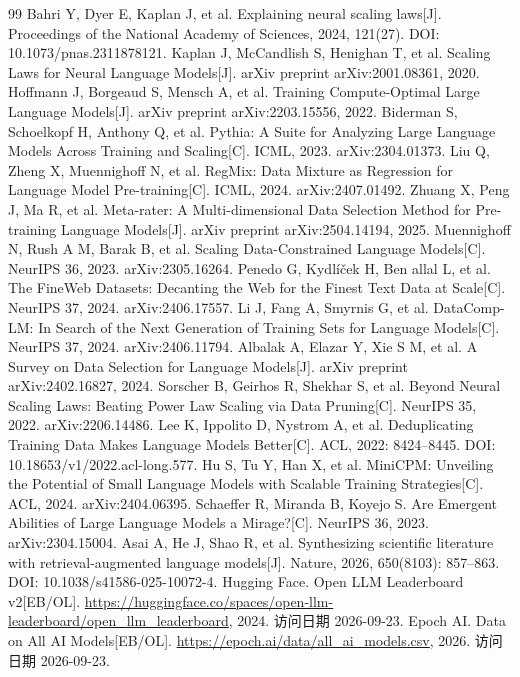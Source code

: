\documentclass[bwprint]{gmcmthesis}
\begin{document}
\begin{thebibliography}{99}
 Bahri Y, Dyer E, Kaplan J, et al. Explaining neural scaling laws[J]. Proceedings of the National Academy of Sciences, 2024, 121(27). DOI: 10.1073/pnas.2311878121.
 Kaplan J, McCandlish S, Henighan T, et al. Scaling Laws for Neural Language Models[J]. arXiv preprint arXiv:2001.08361, 2020.
 Hoffmann J, Borgeaud S, Mensch A, et al. Training Compute-Optimal Large Language Models[J]. arXiv preprint arXiv:2203.15556, 2022.
 Biderman S, Schoelkopf H, Anthony Q, et al. Pythia: A Suite for Analyzing Large Language Models Across Training and Scaling[C]. ICML, 2023. arXiv:2304.01373.
 Liu Q, Zheng X, Muennighoff N, et al. RegMix: Data Mixture as Regression for Language Model Pre-training[C]. ICML, 2024. arXiv:2407.01492.
 Zhuang X, Peng J, Ma R, et al. Meta-rater: A Multi-dimensional Data Selection Method for Pre-training Language Models[J]. arXiv preprint arXiv:2504.14194, 2025.
 Muennighoff N, Rush A M, Barak B, et al. Scaling Data-Constrained Language Models[C]. NeurIPS 36, 2023. arXiv:2305.16264.
 Penedo G, Kydlíček H, Ben allal L, et al. The FineWeb Datasets: Decanting the Web for the Finest Text Data at Scale[C]. NeurIPS 37, 2024. arXiv:2406.17557.
 Li J, Fang A, Smyrnis G, et al. DataComp-LM: In Search of the Next Generation of Training Sets for Language Models[C]. NeurIPS 37, 2024. arXiv:2406.11794.
 Albalak A, Elazar Y, Xie S M, et al. A Survey on Data Selection for Language Models[J]. arXiv preprint arXiv:2402.16827, 2024.
 Sorscher B, Geirhos R, Shekhar S, et al. Beyond Neural Scaling Laws: Beating Power Law Scaling via Data Pruning[C]. NeurIPS 35, 2022. arXiv:2206.14486.
 Lee K, Ippolito D, Nystrom A, et al. Deduplicating Training Data Makes Language Models Better[C]. ACL, 2022: 8424--8445. DOI: 10.18653/v1/2022.acl-long.577.
 Hu S, Tu Y, Han X, et al. MiniCPM: Unveiling the Potential of Small Language Models with Scalable Training Strategies[C]. ACL, 2024. arXiv:2404.06395.
 Schaeffer R, Miranda B, Koyejo S. Are Emergent Abilities of Large Language Models a Mirage?[C]. NeurIPS 36, 2023. arXiv:2304.15004.
 Asai A, He J, Shao R, et al. Synthesizing scientific literature with retrieval-augmented language models[J]. Nature, 2026, 650(8103): 857--863. DOI: 10.1038/s41586-025-10072-4.
 Hugging Face. Open LLM Leaderboard v2[EB/OL]. \url{https://huggingface.co/spaces/open-llm-leaderboard/open_llm_leaderboard}, 2024. 访问日期 2026-09-23.
 Epoch AI. Data on All AI Models[EB/OL]. \url{https://epoch.ai/data/all_ai_models.csv}, 2026. 访问日期 2026-09-23.
\end{thebibliography}

\begin{appendices}

\end{appendices}
\end{document}
